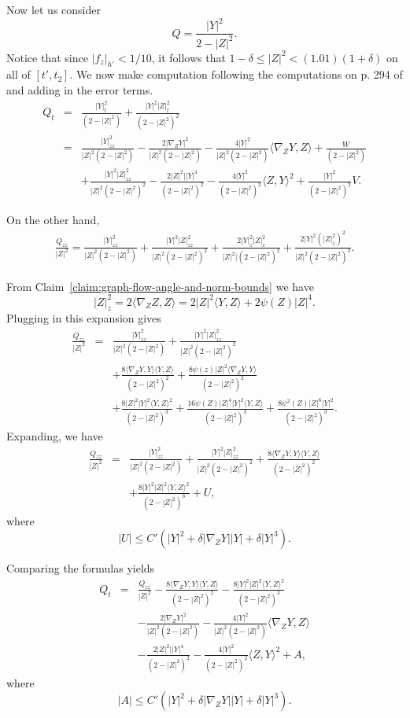  Now let us consider
$$Q=\frac{|Y|^2}{2-|Z|^2}.$$
Notice that since $|f_z|_{h'}<1/10$, it follows that $1-\delta\le
|Z|^2<(1.01)(1+\delta)$ on all of $[t',t_2]$. We now make computation following
the computations on p. 294 of \cite{AG} and adding in the error terms.
\begin{eqnarray*}
Q_t & = & \frac{|Y|^2_t}{(2-|Z|^2)}+\frac{|Y|^2|Z|^2_t}{(2-|Z|^2)^2} \\
& = & \frac{|Y|^2_{zz}}{|Z|^2(2-|Z|^2)}-\frac{2|\nabla_ZY|^2}{|Z|^2(2-|Z|^2)}
 -\frac{4|Y|^2}{|Z|^2(2-|Z|^2)}\langle
 \nabla_ZY,Z\rangle+\frac{W}{(2-|Z|^2)} \\
 & &
 +\frac{|Y|^2|Z|^2_{zz}}{|Z|^2(2-|Z|^2)^2}-\frac{2|Z|^2||Y|^4}{(2-|Z|^2)^2}
 -\frac{4|Y|^2}{(2-|Z|^2)^2}\langle Z,Y\rangle^2+\frac{|Y|^2}{(2-|Z|^2)^2}V.
\end{eqnarray*}

On the other hand,
\begin{eqnarray*}
\frac{Q_{zz}}{|Z|^2}=\frac{|Y|^2_{zz}}{|Z|^2(2-|Z|^2)}+
\frac{|Y|^2|Z|^2_{zz}}{|Z|^2(2-|Z|^2)^2}+\frac{2|Y|^2_z|Z|^2_z}{|Z|^2|(2-|Z|^2)^2}
+\frac{2|Y|^2\left(|Z|^2_z\right)^2}{|Z|^2(2-|Z|^2)^3}.
\end{eqnarray*}


From Claim~\ref{claim:graph-flow-angle-and-norm-bounds} we have
$$|Z|^2_z=2\langle\nabla_ZZ,Z\rangle=2|Z|^2\langle Y,Z\rangle+2\psi(Z)|Z|^4.$$
Plugging in this expansion gives
\begin{eqnarray*}
\frac{Q_{zz}}{|Z|^2} & = & \frac{|Y|^2_{zz}}{|Z|^2(2-|Z|^2)}+
\frac{|Y|^2|Z|^2_{zz}}{|Z|^2(2-|Z|^2)^2} \\
& & +\frac{8\langle \nabla_ZY,Y\rangle\langle
Y,Z\rangle}{(2-|Z|^2)^2}+\frac{8\psi(z)|Z|^2\langle
\nabla_ZY,Y\rangle}{(2-|Z|^2)^2} \\
& & +\frac{8|Z|^2|Y|^2\langle
Y,Z\rangle^2}{(2-|Z|^2)^3}+\frac{16\psi(Z)|Z|^4|Y|^2\langle
Y,Z\rangle}{(2-|Z|^2)^3}+\frac{8\psi^2(Z)|Z|^6|Y|^2}{(2-|Z|^2)^3}.
\end{eqnarray*}
Expanding, we have
\begin{eqnarray*}
\frac{Q_{zz}}{|Z|^2} & = & \frac{|Y|^2_{zz}}{|Z|^2(2-|Z|^2)}+
\frac{|Y|^2|Z|^2_{zz}}{|Z|^2(2-|Z|^2)^2}+\frac{8\langle
\nabla_ZY,Y\rangle\langle Y,Z\rangle}{(2-|Z|^2)^2}  \\
& & +\frac{8|Y|^2|Z|^2\langle Y,Z\rangle^2}{(2-|Z|^2)^3}+U,
\end{eqnarray*}
where
$$|U|\le C'(|Y|^2+\delta|\nabla_ZY||Y|+\delta|Y|^3).$$

Comparing the formulas yields
\begin{eqnarray*}
Q_t & = & \frac{Q_{zz}}{|Z|^2}-\frac{8\langle \nabla_ZY,Y\rangle\langle
Y,Z\rangle}{(2-|Z|^2)^2}-\frac{8|Y|^2|Z|^2\langle Y,Z\rangle^2}{(2-|Z|^2)^3} \\
& & -\frac{2|\nabla_ZY|^2}{|Z|^2(2-|Z|^2)}
 -\frac{4|Y|^2}{|Z|^2(2-|Z|^2)}\langle
 \nabla_ZY,Z\rangle \\
 & & -\frac{2|Z|^2||Y|^4}{(2-|Z|^2)^2}
 -\frac{4|Y|^2}{(2-|Z|^2)^2}\langle Z,Y\rangle^2+A,
\end{eqnarray*}
where
$$|A|\le C'(|Y|^2+\delta|\nabla_ZY||Y|+\delta|Y|^3).$$

